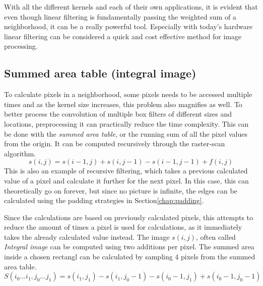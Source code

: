 \documentclass[twoside,a4paper,article]{combine}
\begin{document}
With all the different kernels and each of their own applications, it is evident that even though linear filtering is fundamentally passing the weighted sum of a neighborhood, it can be a really powerful tool. Especially with today's hardware
linear filtering can be considered a quick and cost effective method for image processing.

\subsection{Summed area table (integral image)}
To calculate pixels in a neighborhood, some pixels needs to be accessed multiple times and as the kernel size increases, this problem also magnifies as well. To
better process the convolution of multiple box filters of different sizes and locations, preprocessing it can practically reduce the time complexity. 
This can be done with the
\emph{summed area table}, or the running sum of all the pixel values from the origin. It can be computed recursively through the raster-scan algorithm.
\[
    s(i, j) = s(i - 1, j) + s(i, j - 1) - s(i - 1,j - 1) + f(i, j)   
\]
This is also an example of recursive filtering, which takes a previous calculated value of a pixel and calculate it further for the next pixel. In this case, this can theoretically go on forever, but since no picture is infinite,
the edges can be calculated using the padding strategies in Section\ref{chap:padding}.

Since the calculations are based on previously calculated pixels, this attempts to reduce the amount of times a pixel is used for calculations, as it immediately takes the already calculated value
instead. The image $s(i, j)$, often called \emph{Integral image} can be computed using two additions per pixel. The summed area inside a chosen rectangl can be calculated by sampling 4 pixels from the summed area table.
\[
    S(i_0\hdots i_1, j_0\hdots j_1) = s(i_1, j_1) - s(i_1, j_0 - 1) - s(i_0 - 1, j_1) + s(i_0 - 1, j_0 - 1)
\]
 
\end{document}
